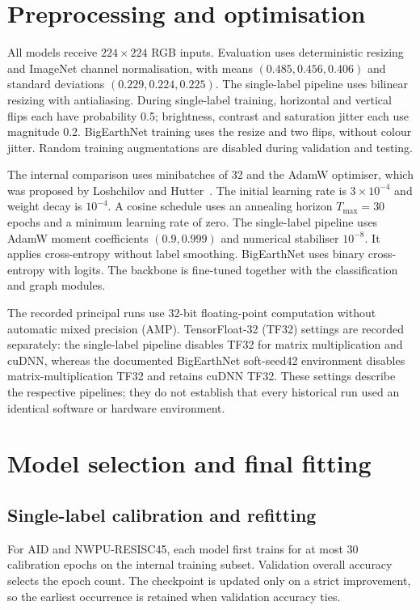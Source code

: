 \section{Preprocessing and optimisation}

All models receive $224\times224$ RGB inputs. Evaluation uses deterministic
resizing and ImageNet channel normalisation, with means
$(0.485,0.456,0.406)$ and standard deviations $(0.229,0.224,0.225)$.
The single-label pipeline uses bilinear resizing with antialiasing. During
single-label training, horizontal and vertical flips each have probability
0.5; brightness, contrast and saturation jitter each use magnitude 0.2.
BigEarthNet training uses the resize and two flips, without colour jitter.
Random training augmentations are disabled during validation and testing.

The internal comparison uses minibatches of 32 and the AdamW optimiser,
which was proposed by Loshchilov and Hutter~\cite{loshchilov2019adamw}.
The initial learning rate is $3\times10^{-4}$ and weight decay is
$10^{-4}$. A cosine schedule uses an annealing horizon $T_{\max}=30$ epochs and a
minimum learning rate of zero. The single-label pipeline uses AdamW moment
coefficients $(0.9,0.999)$ and numerical stabiliser $10^{-8}$. It applies
cross-entropy without label smoothing. BigEarthNet uses binary
cross-entropy with logits. The backbone is fine-tuned together with the
classification and graph modules.

The recorded principal runs use 32-bit floating-point computation without
automatic mixed precision (AMP). TensorFloat-32 (TF32) settings are recorded
separately: the single-label pipeline disables TF32 for matrix multiplication
and cuDNN, whereas the documented BigEarthNet soft-seed42 environment disables
matrix-multiplication TF32 and retains cuDNN TF32. These settings describe the
respective pipelines; they do not establish that every historical run used
an identical software or hardware environment.

\section{Model selection and final fitting}

\subsection{Single-label calibration and refitting}

For AID and NWPU-RESISC45, each model first trains for at most 30 calibration
epochs on the internal training subset. Validation overall accuracy selects
the epoch count. The checkpoint is updated only on a strict improvement,
so the earliest occurrence is retained when validation accuracy ties.

